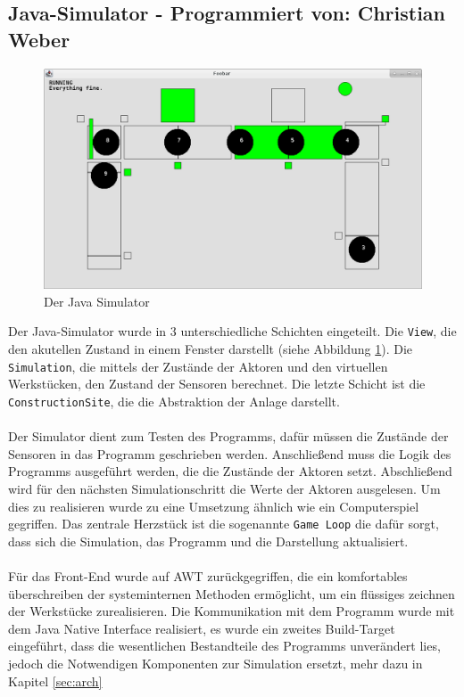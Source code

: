 \documentclass[fontsize=11pt,a4paper,final]{scrartcl}[2003/01/01]
\makeatletter
\def\ScaleIfNeeded{%
	\ifdim\Gin@nat@width>\linewidth
		\linewidth
	\else
		\Gin@nat@width
	\fi
}
\newcommand*{\chris}{%
	Programmiert von: Christian Weber
}
\makeatother
\begin{document}
\subsection{Java-Simulator - \chris}

\begin{figure}[H]
	\centering
	\includegraphics[width=1\ScaleIfNeeded]{Bilder/Java-Simulator.png}
	\caption{Der Java Simulator}
	\label{fig:Java-Simulator}
\end{figure}
Der Java-Simulator wurde in 3 unterschiedliche Schichten eingeteilt. Die \lstinline|View|, die den akutellen Zustand in einem Fenster darstellt (siehe Abbildung \ref{fig:Java-Simulator}). Die \lstinline|Simulation|, die mittels der Zustände der Aktoren und den virtuellen Werkstücken, den Zustand der Sensoren berechnet. Die letzte Schicht ist die \lstinline|ConstructionSite|, die die Abstraktion der Anlage darstellt.\\
\\
Der Simulator dient zum Testen des Programms, dafür müssen die Zustände der Sensoren in das Programm geschrieben werden. Anschließend muss die Logik des Programms ausgeführt werden, die die Zustände der Aktoren setzt. Abschließend wird für den nächsten Simulationschritt die Werte der Aktoren ausgelesen. Um dies zu realisieren wurde zu eine Umsetzung ähnlich wie ein Computerspiel gegriffen. Das zentrale Herzstück ist die sogenannte \lstinline|Game Loop| die dafür sorgt, dass sich die Simulation, das Programm und die Darstellung aktualisiert.\\
\\
Für das Front-End wurde auf AWT zurückgegriffen, die ein komfortables überschreiben der systeminternen Methoden ermöglicht, um ein flüssiges zeichnen der Werkstücke zurealisieren. Die Kommunikation mit dem Programm wurde mit dem Java Native Interface realisiert, es wurde ein zweites Build-Target eingeführt, dass die wesentlichen Bestandteile des Programms unverändert lies, jedoch die Notwendigen Komponenten zur Simulation ersetzt, mehr dazu in Kapitel \ref{sec:arch}\\
\end{document}
